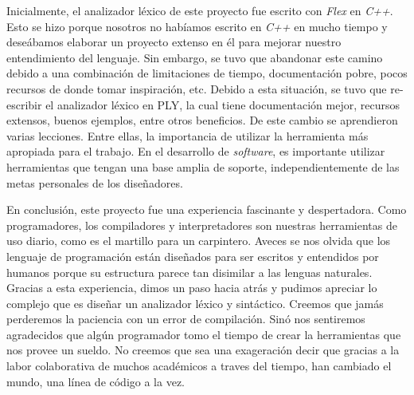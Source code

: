 Inicialmente, el analizador léxico de este proyecto fue escrito con \textit{Flex} \cite{noauthor_flex_nodate} en \textit{C++}. 
Esto se hizo porque nosotros no habíamos escrito en \textit{C++} en mucho tiempo y deseábamos elaborar un proyecto extenso en él para mejorar nuestro entendimiento del lenguaje. 
Sin embargo, se tuvo que abandonar este camino debido a una combinación de limitaciones de tiempo, documentación pobre, pocos recursos de donde tomar inspiración, etc. 
Debido a esta situación, se tuvo que re-escribir el analizador léxico en PLY, la cual tiene documentación mejor, recursos extensos, buenos ejemplos, entre otros beneficios. 
De este cambio se aprendieron varias lecciones. 
Entre ellas, la importancia de utilizar la herramienta más apropiada para el trabajo. 
En el desarrollo de \textit{software}, es importante utilizar herramientas que tengan una base amplia de soporte, independientemente de las metas personales de los diseñadores. 

En conclusión, este proyecto fue una experiencia fascinante y despertadora.
Como programadores, los compiladores y interpretadores son nuestras herramientas de uso diario, como es el martillo para un carpintero.
Aveces se nos olvida que los lenguaje de programación están diseñados para ser escritos y entendidos por humanos porque su estructura parece tan disimilar a las lenguas naturales. 
Gracias a esta experiencia, dimos un paso hacia atrás y pudimos apreciar lo complejo que es diseñar un analizador léxico y sintáctico.
Creemos que jamás perderemos la paciencia con un error de compilación.
Sinó nos sentiremos agradecidos que algún programador tomo el tiempo de crear la herramientas que nos provee un sueldo. 
No creemos que sea una exageración decir que gracias a la labor colaborativa de muchos académicos a traves del tiempo, han cambiado el mundo, una línea de código a la vez.
